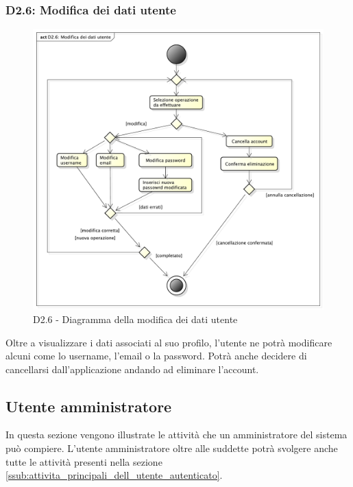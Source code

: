 		\subsubsection{D2.6: Modifica dei dati utente} %
		\label{ssub:modifica_dei_dati_utente}
		\begin{figure}[!htbp]
			\centering
			\centerline{\includegraphics[scale=0.45]{./images/D2_6.pdf}}
			\caption{D2.6 - Diagramma della modifica dei dati utente}
		\end{figure}
		\noindent
		Oltre a visualizzare i dati associati al suo profilo, l'utente ne potrà modificare alcuni come lo username, l'email o la password. Potrà anche decidere di cancellarsi dall'applicazione andando ad eliminare l'account.



	\pagebreak
	\clearpage \newpage


	\subsection{Utente amministratore} %
	\label{sub:utente_amministratore}
	In questa sezione vengono illustrate le attività che un amministratore del sistema può compiere. L'utente amministratore oltre alle suddette potrà svolgere anche tutte le attività presenti nella sezione \ref{ssub:attivita_principali_dell_utente_autenticato}.
